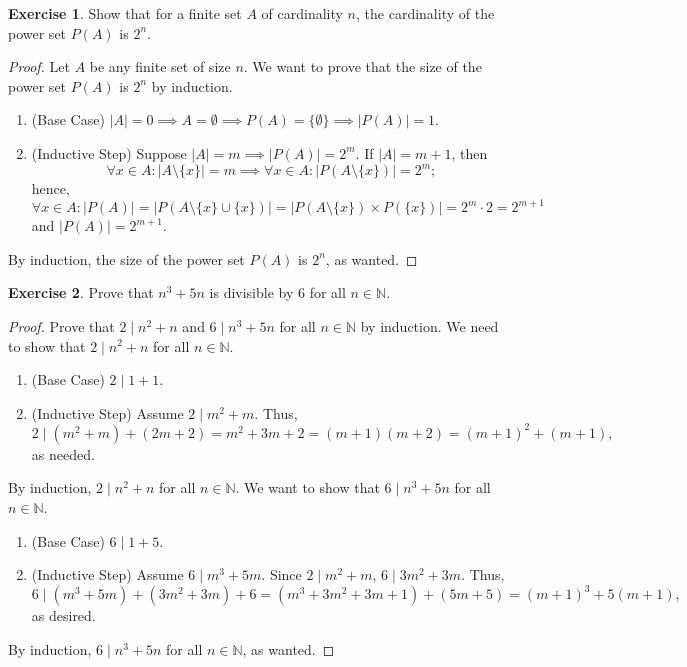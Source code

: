 \documentclass[12pt]{article}
\theoremstyle{definition}
\newtheorem{exercise}{Exercise}
\begin{document}
\begin{exercise}
    Show that for a finite set $A$ of cardinality $n$, the cardinality of the power set $P(A)$ is $2^n$.
\end{exercise}

\begin{proof}
    Let $A$ be any finite set of size $n$. We want to prove that the size of the power set $P(A)$ is $2^n$ by induction.
    \begin{enumerate}[label=\arabic*)]
        \item (Base Case) $\vert A \vert = 0 \implies A = \emptyset \implies P(A) = \{\emptyset\} \implies \vert P(A) \vert = 1$.
        \item (Inductive Step) Suppose $\vert A \vert = m \implies \vert P(A) \vert = 2^m$. If $\vert A \vert = m + 1$, then 
        \[
            \forall x \in A : \vert A \setminus \{x\} \vert = m \implies \forall x \in A : \vert P(A\setminus\{x\}) \vert = 2^m;
        \]
        hence,
        \[
            \forall x \in A : \vert P(A) \vert = \vert P(A \setminus \{x\} \cup \{x\}) \vert = \vert P(A\setminus\{x\}) \times P(\{x\}) \vert = 2^{m} \cdot 2 = 2^{m + 1}
        \]
        and $\vert P(A) \vert = 2^{m + 1}$. 
    \end{enumerate}
    By induction, the size of the power set $P(A)$ is $2^n$, as wanted.
\end{proof}

\begin{exercise}
    Prove that $n^3 + 5n$ is divisible by $6$ for all $n \in \mathbb{N}$.
\end{exercise}

\begin{proof}
    Prove that $2 \mid n^2 + n$ and $6 \mid n^3 + 5n$ for all $n \in \mathbb{N}$ by induction. We need to show that $2 \mid n^2 + n$ for all $n \in \mathbb{N}$.
    \begin{enumerate}[label=\arabic*)]
        \item (Base Case) $2 \mid 1 + 1$.
        \item (Inductive Step) Assume $2 \mid m^2 + m$. Thus, 
        \[
            2 \mid (m^2 + m) + (2m + 2) = m^2 + 3m + 2 = (m + 1)(m + 2) = (m + 1)^2 + (m + 1),
        \]
        as needed.
    \end{enumerate}
    By induction, $2 \mid n^2 + n$ for all $n \in \mathbb{N}$. We want to show that $6 \mid n^3 + 5n$ for all $n \in \mathbb{N}$.
    \begin{enumerate}[label=\arabic*)]
        \item (Base Case) $6 \mid 1 + 5$.
        \item (Inductive Step) Assume $6 \mid m^3 + 5m$. Since $2 \mid m^2 + m$, $6 \mid 3m^2 + 3m$. Thus, 
        \[
            6 \mid (m^3 + 5m) + (3m^2 + 3m) + 6 = (m^3 + 3m^2 + 3m + 1) + (5m + 5) = (m + 1)^3 + 5(m + 1),
        \]
        as desired.
    \end{enumerate}
    By induction, $6 \mid n^3 + 5n$ for all $n \in \mathbb{N}$, as wanted.
\end{proof}
\end{document}
